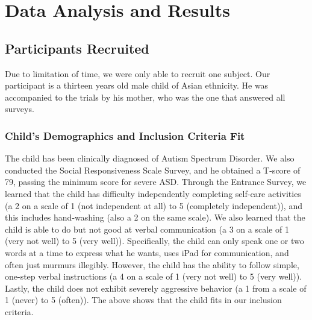 \documentclass{ut-thesis}
\begin{document}

\section{Data Analysis and Results}


\subsection{Participants Recruited}
Due to limitation of time, we were only able to recruit one subject.  Our participant is a thirteen years old male child of Asian ethnicity.  He was accompanied to the trials by his mother, who was the one that answered all surveys.

\subsubsection{Child's Demographics and Inclusion Criteria Fit}
The child has been clinically diagnosed of Autism Spectrum Disorder.  We also conducted the Social Responsiveness Scale Survey, and he obtained a T-score of 79, passing the minimum score for severe ASD.  Through the Entrance Survey, we learned that the child has difficulty independently completing self-care activities (a 2 on a scale of 1 (not independent at all) to 5 (completely independent)), and this includes hand-washing (also a 2 on the same scale).  We also learned that the child is able to do but not good at verbal communication (a 3 on a scale of 1 (very not well) to 5 (very well)).  Specifically, the child can only speak one or two words at a time to express what he wants, uses iPad for communication, and often just murmurs illegibly.  However, the child has the ability to follow simple, one-step verbal instructions (a 4 on a scale of 1 (very not well) to 5 (very well)).  Lastly, the child does not exhibit severely aggressive behavior (a 1 from a scale of 1 (never) to 5 (often)).  The above shows that the child fits in our inclusion criteria.
\end{document}
